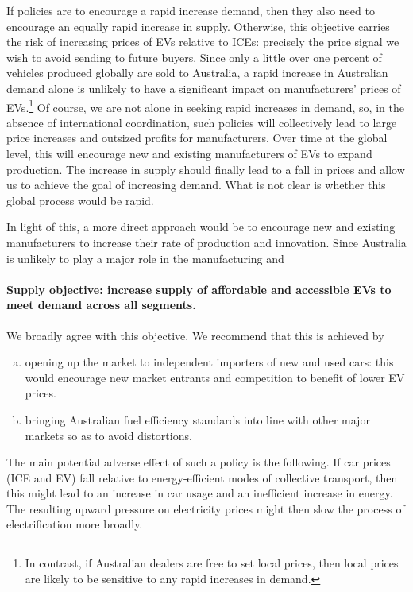 \documentclass[12pt, draft]{article} \usepackage[shortlabels]{enumitem}
\begin{document}
If policies are to encourage a rapid increase demand, then they also need to
encourage an equally rapid increase in supply.  Otherwise, this objective
carries the risk of increasing prices of EVs relative to ICEs: precisely the
price signal we wish to avoid sending to future buyers.  Since only a little
over one percent of vehicles produced globally are sold to Australia, a rapid
increase in Australian demand alone is unlikely to have a significant impact on
manufacturers' prices of EVs.\footnote{In contrast, if Australian dealers are
free to set local prices, then local prices are likely to be sensitive to any
rapid increases in demand.} Of course, we are not alone in seeking rapid
increases in demand, so, in the absence of international coordination, such
policies will collectively lead to large price increases and outsized profits
for manufacturers. Over time at the global level, this will encourage new and
existing manufacturers of EVs to expand production. The increase in supply
should finally lead to a fall in prices and allow us to achieve the goal of
increasing demand. What is not clear is whether this global process would be
rapid.

In light of this, a more direct approach would be to encourage new and existing
manufacturers to increase their rate of production and innovation. Since
Australia is unlikely to play a major role in the manufacturing and 

\paragraph{Supply objective: increase supply of affordable and accessible EVs
to meet demand across all segments.} We broadly agree with this objective. We
recommend that this is achieved by

\begin{enumerate}[(a)]

\item
opening up the market to independent importers of new and used cars: this would
encourage new market entrants and competition to benefit of lower EV prices.

\item
bringing Australian fuel efficiency standards into line with other major
markets so as to avoid distortions.

\end{enumerate}

The main potential adverse effect of such a policy is the following. If car
prices (ICE and EV) fall relative to energy-efficient modes of collective
transport, then this might lead to an increase in car usage and an inefficient
increase in energy. The resulting upward pressure on electricity prices might
then slow the process of electrification more broadly.
\end{document}
